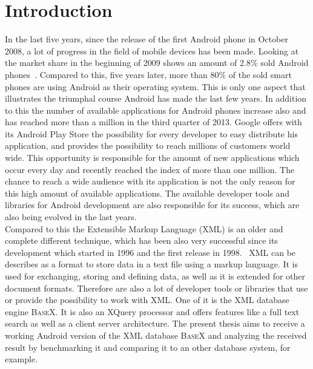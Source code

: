 \chapter{Introduction}
\label{cha:introduction}
In the last five years, since the release of the first Android phone in October 2008, a lot of progress in the field of mobile devices has been made.
Looking at the market share in the beginning of 2009 shows an amount of 2.8\% sold Android phones~\cite{gandhewar2010google}.
Compared to this, five years later, more than 80\% of the sold smart phones are using Android as their operating system.
This is only one aspect that illustrates the triumphal course Android has made the last few years.
In addition to this the number of available applications for Android phones increase also and has reached more than a million in the third quarter of 2013.
Google offers with its Android Play Store the possibility for every developer to easy distribute his application, and provides the possibility to reach millions of customers world wide.
This opportunity is responsible for the amount of new applications which occur every day and recently reached the index of more than one million.
The chance to reach a wide audience with its application is not the only reason for this high amount of available applications.
The available developer tools and libraries for Android development are also responsible for its success, which are also being evolved in the last years.\\
Compared to this the Extensible Markup Language (XML) is an older and complete different technique, which has been also very successful since its development which started in 1996 and the first release in 1998.~\cite{bray1998extensible}
XML can be describes as a format to store data in a text file using a markup language.
It is used for exchanging, storing and defining data, as well as it is extended for other document formats.
Therefore are also a lot of developer tools or libraries that use or provide the possibility to work with XML.
One of it is the XML database engine \textsc{BaseX}.
It is also an XQuery processor and offers features like a full text search as well as a client server architecture.
The present thesis aims to receive a working Android version of the XML database \textsc{BaseX} and analyzing the received result by benchmarking it and comparing it to an other database system, for example.

\newpage
